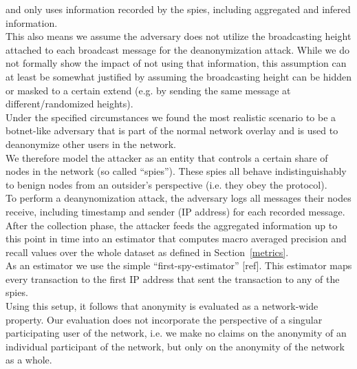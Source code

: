and only uses information recorded by the spies, including aggregated
and infered information. \\
This also means we assume the adversary does not utilize the broadcasting height attached to each broadcast message
for the deanonymization attack. While we do not formally show the impact
of not using that information,
this assumption can at least be somewhat justified by assuming the broadcasting height can
be hidden or masked to a certain extend (e.g. by sending the same message at different/randomized heights). \\
Under the specified circumstances we found the most realistic scenario
to be a botnet-like adversary that is part of the normal network overlay
and is used to deanonymize other users in the network. \\
We therefore model the attacker as an entity that controls a certain share of nodes in the network (so called ``spies'').
These spies all behave indistinguishably to benign nodes from an outsider's perspective (i.e. they obey the protocol). \\
To perform a deanynomization attack, the adversary logs all messages their nodes receive,
including timestamp and sender (IP address) for each recorded message. After the collection phase,
the attacker feeds the aggregated information up to this point in time into an estimator that
computes macro averaged precision and recall values over the whole dataset as defined in
Section~\ref{metrics}. \\
As an estimator we use the simple ``first-spy-estimator'' [ref].
This estimator maps every transaction to the first IP address that
sent the transaction to any of the spies. \\
Using this setup, it follows that anonymity is evaluated as a
network-wide property. Our evaluation does not incorporate the
perspective of a singular participating user of the network, i.e. we
make no claims on the anonymity of an individual participant of
the network, but only on the anonymity of the network as a whole.
